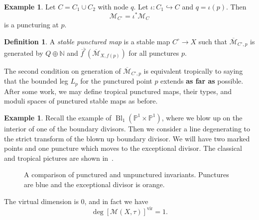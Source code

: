 \documentclass[leqno, openany]{memoir}
\theoremstyle{definition}
\newtheorem{defn}[thm]{Definition}
\newtheorem{exm}[thm]{Example}
\theoremstyle{remark}
\theoremstyle{plain}
\theoremstyle{definition}
\theoremstyle{remark}
\newcommand{\N}{\mathbb{N}}
\renewcommand{\P}{\mathbb{P}}
\newcommand{\mc}[1]{\mathcal{#1}}
\newcommand{\mr}[1]{\mathrm{#1}}
\newcommand{\ol}[1]{\overline{#1}}
\DeclareMathOperator{\Bl}{Bl}
\begin{document}
\begin{exm}
  Let $C = C_1 \cup C_2$ with node $q$. Let $\iota \colon C_1 \hookrightarrow C$ and $q = \iota(p)$. Then
  \[ \mc{M}_{C^{\circ}} = \iota^* \mc{M}_C \]
  is a puncturing at $p$.
\end{exm}

\begin{defn}
A \textit{stable punctured map} is a stable map $C^{\circ} \to X$ such that $\ol{\mc{M}}_{C^{\circ}, p}$ is generated by $Q \oplus \N$ and $\ol{f}^{\flat}(\ol{\mc{M}}_{X,f(p)})$ for all punctures $p$.
\end{defn}

The second condition on generation of $\ol{\mc{M}}_{C^{\circ},p}$ is equivalent tropically to saying that the bounded leg $L_p$ for the punctured point $p$ extends \textbf{as far as} possible. After some work, we may define tropical punctured maps, their types, and moduli spaces of punctured stable maps as before.

\begin{exm}
  Recall the example of $\Bl_1(\P^1 \times \P^1)$, where we blow up on the interior of one of the boundary divisors. Then we consider a line degenerating to the strict transform of the blown up boundary divisor. We will have two marked points and one puncture which moves to the exceptional divisor. The classical and tropical pictures are shown in~.
  \begin{figure}[htpb]
    \centering
    \caption{A comparison of punctured and unpunctured invariants. Punctures are blue and the exceptional divisor is orange.}
    \label{fig:punctured}
  \end{figure}

  The virtual dimension is $0$, and in fact we have
  \[ \deg [\mc{M}(X, \tau)]^{\mr{vir}} = 1. \]
\end{exm}
\end{document}
